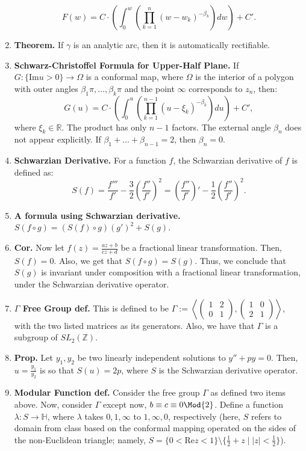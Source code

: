 \begin{enumerate}
	$$
	F(w) = C \cdot \left(\int_{0}^{w} \left(\prod_{k=1}^{n} (w-w_k)^{-\beta_k}\right) dw \right) + C'. 
	$$
	\item \textbf{Theorem. } If $\gamma$ is an analytic arc, then it is automatically rectifiable. 
	\item \textbf{Schwarz-Christoffel Formula for Upper-Half Plane. } If $G: \{\textrm{Im} u > 0\} \to \Omega$ is a conformal map, where $\Omega$ is the interior of a polygon with outer angles $\beta_1\pi,\dots,\beta_k\pi$ and the point $\infty$ corresponds to $z_n$, then: 
	$$
	G(u) = C \cdot \left(\int_{0}^{u} \left(\prod_{k=1}^{n-1} (u - \xi_k)^{-\beta_k}\right) du \right) + C', 
	$$
	where $\xi_k \in \mathbb{R}$. The product has only $n-1$ factors. The external angle $\beta_n$ does not appear explicitly. If $\beta_1 + \dots + \beta_{n-1}=2$, then $\beta_n = 0$. 
	\item \textbf{Schwarzian Derivative. } For a function $f$, the Schwarzian derivative of $f$ is defined as: 
	$$
	S(f) = \frac{f'''}{f'} - \frac{3}{2}\left(\frac{f''}{f'}\right)^2 = \left(\frac{f''}{f'}\right)' - \frac{1}{2}\left(\frac{f''}{f'}\right)^2. 
	$$
	\item \textbf{A formula using Schwarzian derivative. } $S(f \circ g) = (S(f) \circ g)(g')^2 + S(g)$. 
	\item \textbf{Cor. } Now let $f(z) = \frac{az+b}{cz+d}$ be a fractional linear transformation. Then, $S(f)=0$. Also, we get that $S(f \circ g) = S(g)$. Thus, we conclude that $S(g)$ is invariant under composition with a fractional linear transformation, under the Schwarzian derivative operator. 
	\item \textbf{$\Gamma$ Free Group def. } This is defined to be $\Gamma := \left\langle \begin{pmatrix} 1 & 2 \\ 0 & 1\end{pmatrix}, \begin{pmatrix} 1 & 0 \\ 2 & 1 \end{pmatrix}\right\rangle$, with the two listed matrices as its generators. Also, we have that $\Gamma$ is a subgroup of $SL_2(\mathbb{Z})$. 
	\item \textbf{Prop. } Let $y_1,y_2$ be two linearly independent solutions to $y'' + py=0$. Then, $u = \frac{y_1}{y_2}$ is so that $S(u)=2p$, where $S$ is the Schwarzian derivative operator. 
	\item \textbf{Modular Function def. } Consider the free group $\Gamma$ as defined two items above. Now, consider $\Gamma$ except now, $b \equiv c \equiv 0 \Mod{2}$. Define a function $\lambda: S \to \mathbb{H}$, where $\lambda$ takes $0,1,\infty$ to $1,\infty,0$, respectively (here, $S$ refers to domain from class based on the conformal mapping operated on the sides of the non-Euclidean triangle; namely, $S = \{0 < \textrm{Re} z < 1\} \setminus \{\frac{1}{2} + z \mid |z| < \frac{1}{2}\}$). 

\end{enumerate}
